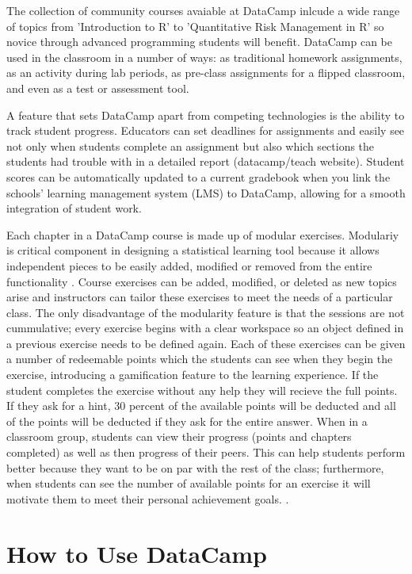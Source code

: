 \documentclass[12pt]{article}
\begin{document}
The collection of community courses avaiable at DataCamp inlcude a wide range of topics from 'Introduction to R' to
'Quantitative Risk Management in R' so novice through advanced programming students will benefit.
DataCamp can be used in the classroom in a number of ways: as traditional homework assignments, as an
activity during lab periods, as pre-class assignments for a flipped classroom, and even as a test or assessment tool.

A feature that sets DataCamp apart from competing technologies is the ability to track student progress. Educators
can set deadlines for assignments and easily see not only when students complete an assignment but also which sections the
students had trouble with in a detailed report (datacamp/teach website). Student scores can be automatically updated to a
current gradebook when you link the schools' learning management system (LMS) to DataCamp, allowing for a smooth integration of student work.

Each chapter in a DataCamp course is made up of modular exercises. Modulariy is critical component in designing a statistical
learning tool because it allows independent pieces to be easily added, modified or removed from the entire functionality
\cite{Hare2017}. Course exercises can be added, modified, or deleted as new topics arise and instructors can tailor
these exercises to meet the needs of a particular class. The only disadvantage of the modularity feature is that the sessions
are not cummulative; every exercise begins with a clear workspace so an object defined in a previous exercise needs to be
defined again. Each of these exercises can be given a number of redeemable points which the students can see when they begin
the exercise, introducing a gamification feature to the learning experience. If the student completes the exercise without
any help they will recieve the full points. If they ask for a hint, 30 percent of the available points will be deducted and
all of the points will be deducted if they ask for the entire answer. When in a classroom group, students can view their
progress (points and chapters completed) as well as then progress of their peers. This can help students perform better
because they want to be on par with the rest of the class; furthermore, when students can see the number of available points
for an exercise it will motivate them to meet their personal achievement goals. \citep{Chang2016}.


\section{How to Use DataCamp}
\end{document}

